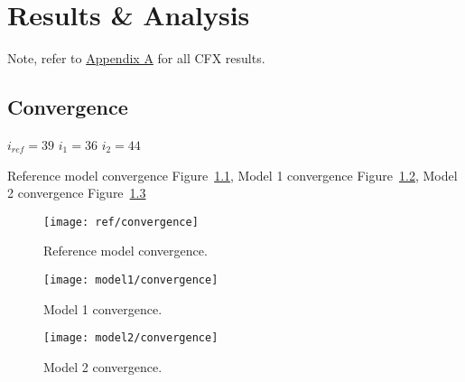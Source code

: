 \chapter{Results \& Analysis}
\label{ch:res}

Note, refer to \hyperlink{appendixa}{Appendix A} for all CFX results.

\section{Convergence}
\label{sec:convg}

$i_{ref}=39$ $i_1=36$ $i_2=44$

Reference model convergence Figure~\ref{fig:ref_convg}, Model 1 convergence Figure~\ref{fig:mod1_convg}, Model 2 convergence Figure~\ref{fig:mod2_convg}

\begin{figure}[H]
	\centering
	\texttt{[image: ref/convergence]}
	\caption{Reference model convergence.}
	\label{fig:ref_convg}
\end{figure}

\begin{figure}[H]
	\centering
	\texttt{[image: model1/convergence]}
	\caption{Model 1 convergence.}
	\label{fig:mod1_convg}
\end{figure}

\begin{figure}[H]
	\centering
	\texttt{[image: model2/convergence]}
	\caption{Model 2 convergence.}
	\label{fig:mod2_convg}
\end{figure}

%

